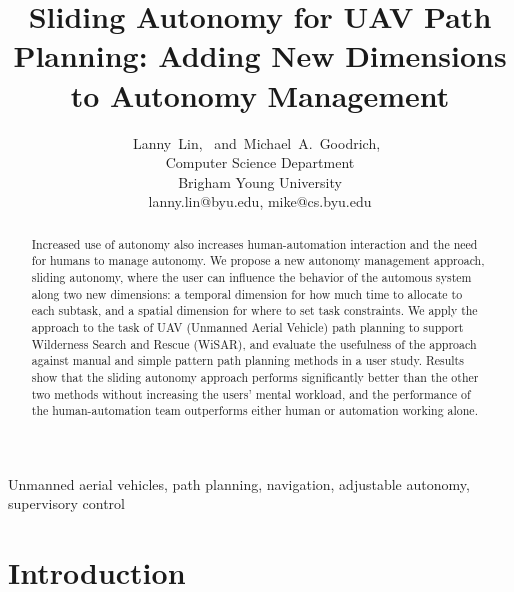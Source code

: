\documentclass[journal]{IEEEtran}
\begin{document}
\title{Sliding Autonomy for UAV Path Planning: Adding New Dimensions to Autonomy Management}

\author{
Lanny~Lin,~
and~Michael~A.~Goodrich,~%
\\Computer Science Department \\ Brigham Young University \\ lanny.lin@byu.edu, mike@cs.byu.edu
}

\maketitle

\begin{abstract}
Increased use of autonomy also increases human-automation interaction and the need for humans to manage autonomy. We propose a new autonomy management approach, sliding autonomy, where the user can influence the behavior of the automous system along two new dimensions: a temporal dimension for how much time to allocate to each subtask, and a spatial dimension for where to set task constraints. We apply the approach to the task of UAV (Unmanned Aerial Vehicle) path planning to support Wilderness Search and Rescue (WiSAR), and evaluate the usefulness of the approach against manual and simple pattern path planning methods in a user study. Results show that the sliding autonomy approach performs significantly better than the other two methods without increasing the users' mental workload, and the performance of the human-automation team outperforms either human or automation working alone.
\end{abstract}


\begin{IEEEkeywords}
Unmanned aerial vehicles, path planning, navigation, adjustable autonomy, supervisory control
\end{IEEEkeywords}

\IEEEpeerreviewmaketitle


\section{Introduction}
\label{sec:Introduction6}
\end{document}
